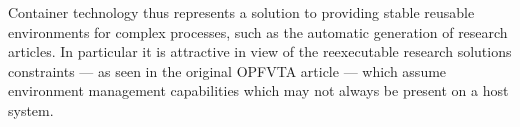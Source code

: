 
Container technology thus represents a solution to providing stable reusable environments for complex processes, such as the automatic generation of research articles.
In particular it is attractive in view of the reexecutable research solutions constraints — as seen in the original OPFVTA article — which assume environment management capabilities which may not always be present on a host system.
